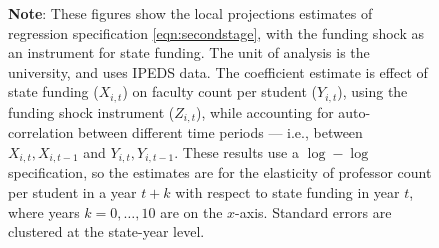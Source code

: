 \begin{figure}[H]
\begin{subfigure}[b]{0.495\textwidth}
        \label{fig:all-count-lp}
    \end{subfigure}
    \label{fig:count-lp}
    \justify
    \footnotesize
    \textbf{Note}:
    These figures show the local projections estimates of regression specification \eqref{eqn:secondstage}, with the funding shock as an instrument for state funding.
    The unit of analysis is the university, and uses IPEDS data.
    The coefficient estimate is effect of state funding ($X_{i,t}$) on faculty count per student ($Y_{i,t}$), using the funding shock instrument ($Z_{i,t}$), while accounting for auto-correlation between different time periods --- i.e., between $X_{i,t}, X_{i,t-1}$ and $Y_{i,t}, Y_{i,t-1}$.
    These results use a $\log-\log$ specification, so the estimates are for the elasticity of professor count per student in a year $t+k$ with respect to state funding in year $t$, where years $k = 0, \hdots, 10$ are on the $x$-axis. 
    Standard errors are clustered at the state-year level.
\end{figure}

